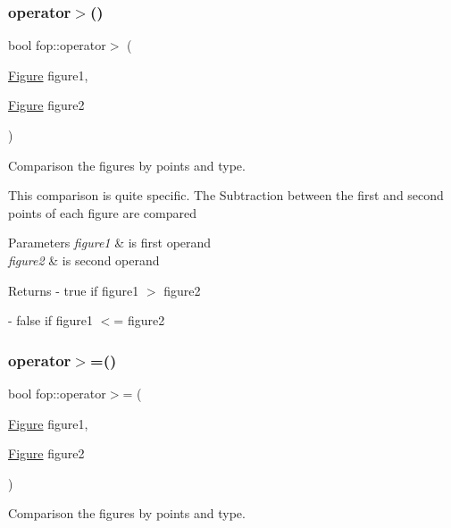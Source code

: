\subsubsection{\texorpdfstring{operator$>$()}{operator>()}}
{\footnotesize\ttfamily bool fop\+::operator$>$ (\begin{DoxyParamCaption}\item[{\mbox{\hyperlink{classfop_1_1_figure}{Figure}}}]{figure1,  }\item[{\mbox{\hyperlink{classfop_1_1_figure}{Figure}}}]{figure2 }\end{DoxyParamCaption})}



Comparison the figures by points and type. 

This comparison is quite specific. The Subtraction between the first and second points of each figure are compared 
\begin{DoxyParams}{Parameters}
{\em figure1} & is first operand \\
\hline
{\em figure2} & is second operand \\
\hline
\end{DoxyParams}
\begin{DoxyReturn}{Returns}
-\/ true if \textquotesingle{}figure1\textquotesingle{} $>$ \textquotesingle{}figure2\textquotesingle{} 

-\/ false if \textquotesingle{}figure1\textquotesingle{} $<$= \textquotesingle{}figure2\textquotesingle{} 
\end{DoxyReturn}
\mbox{\label{namespacefop_a8989439cb0227ca3d76c92a3f515366d}} 
\subsubsection{\texorpdfstring{operator$>$=()}{operator>=()}}
{\footnotesize\ttfamily bool fop\+::operator$>$= (\begin{DoxyParamCaption}\item[{\mbox{\hyperlink{classfop_1_1_figure}{Figure}}}]{figure1,  }\item[{\mbox{\hyperlink{classfop_1_1_figure}{Figure}}}]{figure2 }\end{DoxyParamCaption})}



Comparison the figures by points and type. 

